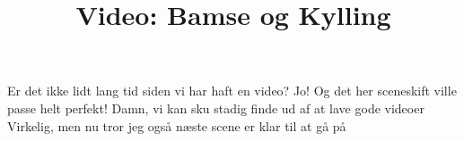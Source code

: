 \documentclass[a4paper,11pt]{article}
\title{Video: Bamse og Kylling}
\begin{document}
\maketitle

\begin{sketch}
 Er det ikke lidt lang tid siden vi har haft en video?
 Jo! Og det her sceneskift ville passe helt perfekt!
 Damn, vi kan sku stadig finde ud af at lave gode videoer
 Virkelig, men nu tror jeg også næste scene er klar til at gå på
\end{sketch}
\end{document}
